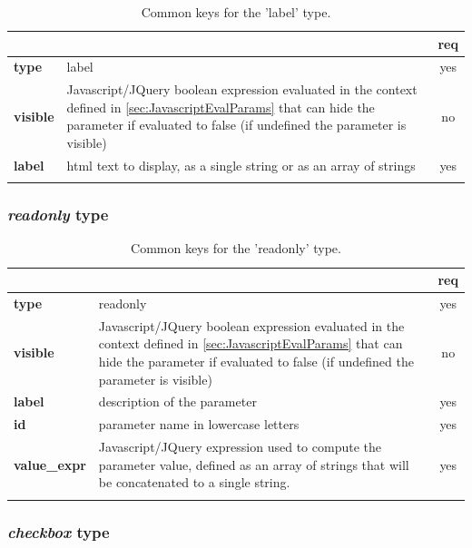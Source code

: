 \begin{longtable}{|>{\bf}L{\linewidth}|L{\linewidth}|c|}
\hline
      &  & {\bf req} 
\tabularnewline \hline \hline
 type  & label       & yes \\ \hline
 visible  & Javascript/JQuery boolean expression evaluated in the context defined 
              in \ref{sec:JavascriptEvalParams} that can hide the parameter if
            evaluated to false (if undefined the parameter is visible)& no \\ \hline
 label & html text to display, as a single string or as an array of strings& yes
                      \\ \hline
\caption{Common keys for the 'label' type.}
\end{longtable}


\subsubsection{ \emph{readonly} type}

\begin{longtable}{|>{\bf}L{\linewidth}|L{\linewidth}|c|}
\hline
      &  & {\bf req} 
\tabularnewline \hline \hline
 type  & readonly    & yes \\ \hline
 visible  & Javascript/JQuery boolean expression evaluated in the context defined 
              in \ref{sec:JavascriptEvalParams} that can hide the parameter if
            evaluated to false (if undefined the parameter is visible)& no \\ \hline
 label & description of the parameter & yes \\ \hline
 id         & parameter name in lowercase letters  & yes \\ \hline
 value\_expr & Javascript/JQuery expression used to compute the parameter value, defined as an
              array of strings that will be concatenated to a single string.
            & yes \\ \hline
\caption{Common keys for the 'readonly' type.}
\end{longtable}

\subsubsection{ \emph{checkbox} type}


